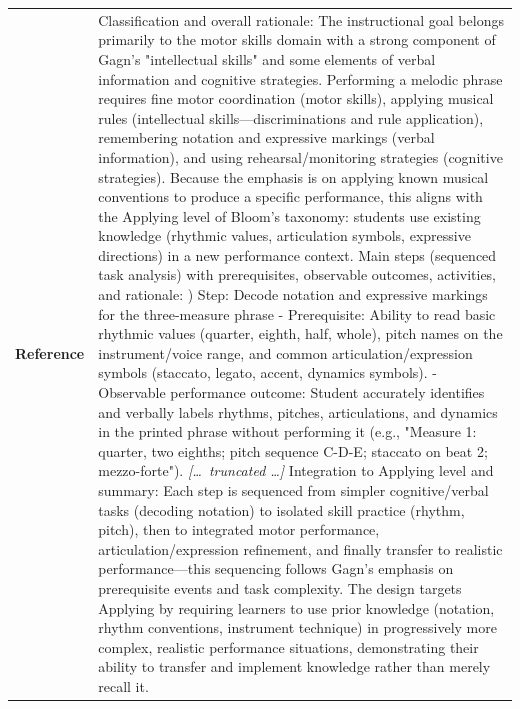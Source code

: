 \begin{longtable}{@{}l p{12.5cm}@{}}
  \textbf{Reference} & Classification and overall rationale: \newline The instructional goal belongs primarily to the motor skills domain with a strong component of Gagn's "intellectual skills" and some elements of verbal information and cognitive strategies. Performing a melodic phrase requires fine motor coordination (motor skills), applying musical rules (intellectual skills---discriminations and rule application), remembering notation and expressive markings (verbal information), and using rehearsal/monitoring strategies (cognitive strategies). Because the emphasis is on applying known musical conventions to produce a specific performance, this aligns with the Applying level of Bloom's taxonomy: students use existing knowledge (rhythmic values, articulation symbols, expressive directions) in a new performance context. \newline Main steps (sequenced task analysis) with prerequisites, observable outcomes, activities, and rationale: \newline 1) Step: Decode notation and expressive markings for the three-measure phrase \newline - Prerequisite: Ability to read basic rhythmic values (quarter, eighth, half, whole), pitch names on the instrument/voice range, and common articulation/expression symbols (staccato, legato, accent, dynamics symbols). \newline - Observable performance outcome: Student accurately identifies and verbally labels rhythms, pitches, articulations, and dynamics in the printed phrase without performing it (e.g., "Measure 1: quarter, two eighths; pitch sequence C-D-E; staccato on beat 2; mezzo-forte"). \newline \textit{[\ldots\ truncated \ldots]} \newline Integration to Applying level and summary: \newline Each step is sequenced from simpler cognitive/verbal tasks (decoding notation) to isolated skill practice (rhythm, pitch), then to integrated motor performance, articulation/expression refinement, and finally transfer to realistic performance---this sequencing follows Gagn's emphasis on prerequisite events and task complexity. The design targets Applying by requiring learners to use prior knowledge (notation, rhythm conventions, instrument technique) in progressively more complex, realistic performance situations, demonstrating their ability to transfer and implement knowledge rather than merely recall it. \\

\end{longtable}
